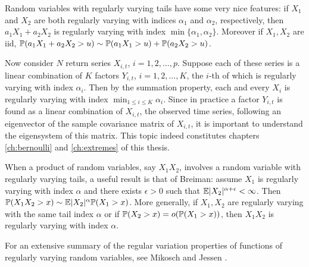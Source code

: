 Random variables with regularly varying tails have some very nice
features: if $X_1$ and $X_2$ are both regularly varying with indices
$\alpha_1$ and $\alpha_2$, respectively, then $a_1 X_1 + a_2 X_2$ is
regularly varying with index $\min\{\alpha_1, \alpha_2\}$. Moreover
if $X_1, X_2$ are iid,
$\P(a_1 X_1 + a_2 X_2 > u) \sim \P(a_1 X_1 > u) + \P(a_2 X_2 > u)$.

Now consider $N$ return series $X_{i,t}$, $i=1,2,\dots, p$. Suppose
each of these series is a linear combination of $K$ factors $Y_{i,t}$,
$i=1,2,\dots,K$, the $i$-th of which is regularly varying with index
$\alpha_i$. Then by the summation property, each and every $X_i$ is
regularly varying with index $\min_{1 \leq i \leq K} \alpha_i$.
Since in practice a factor $Y_{i,t}$ is found as a linear combination
of $X_{i,t}$, the observed time series, following an eigenvector of
the sample covariance matrix of $X_{i,t}$, it is important to
understand the eigensystem of this matrix. This topic indeed
constitutes chapters \ref{ch:bernoulli} and \ref{ch:extremes} of this
thesis.

When a product of random variables, say $X_1 X_2$, involves a random
variable with regularly varying tails, a useful result is that of
Breiman: assume $X_1$ is regularly varying with index $\alpha$ and
there exists $\epsilon > 0$ such that
$\E |X_2|^{\alpha + \epsilon} < \infty$.
Then $\P(X_1 X_2 > x) \sim \E|X_2|^{\alpha} \P(X_1 > x)$.
More generally, if $X_1, X_2$ are regularly varying with the same tail
index $\alpha$ or if $\P(X_2 > x) = o(\P(X_1 > x))$, then $X_1 X_2$ is
regularly varying with index $\alpha$.

For an extensive summary of the regular variation properties of
functions of regularly varying random variables, see Mikosch and
Jessen \cite{JessenMikosch2006}.

